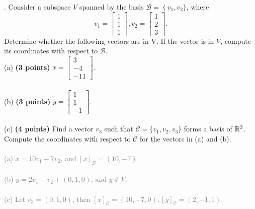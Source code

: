 \documentclass[12pt,a4paper]{article}
\newcommand{\gray}[1]{\textcolor{gray}{#1}}
\renewcommand{\l}{\left}
\renewcommand{\r}{\right}
\def\R{\ifmmode\mathbb R\fi}
\begin{document}
\newpage
{}. Consider a subspace $V$ spanned by the basis $\mathcal B = \l\{v_1, v_2\}$, where
$$v_1 =
    \l[
    \begin{array}{c}
	1\\ 1\\ 1
    \end{array}
    \r],  v_2 =
    \l[
    \begin{array}{c}
	1\\ 2\\ 3
    \end{array}
    \r]
.$$
Determine whether the following vectors are in V. If the vector is in $V$, compute its coordinates with respect to $\mathcal B$.\\ 
(a) \textbf{(3 points)} $x = \l[
\begin{array}{c}
    3\\ -4 \\ -11
\end{array}\r]$. \\
\\
(b) \textbf{(3 points)} $y = \l[
\begin{array}{c}
    1\\ 1\\ -1
\end{array}\r]$. \\
\\
(c) \textbf{(4 points)} Find a vector $v_3$ such that $\mathcal C = \{v_1, v_2, v_3\}$ forms a basis of $\R^3$. Compute the coordinates with respect to $\mathcal C$ for the vectors in (a) and (b). \\
\\
\gray{
    (a) $x = 10v_1 - 7 v_2$, and $[x]_{\mathcal B} = (10, -7)$. \\
    \\
    (b) $y = 2v_1 - v_2 + (0, 1, 0)$, and $y \notin V$. \\
    \\
    (c) Let $v_3 = (0, 1, 0)$, then $[x]_{\mathcal C} = (10, -7, 0), [y]_{\mathcal C} = (2, -1, 1)$.
}
\end{document}
